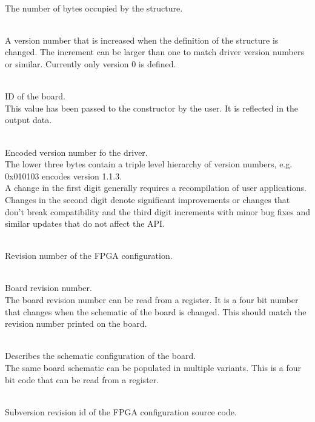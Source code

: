			\\
			The number of bytes occupied by the structure.

			\\
			A version number that is increased when the definition of the structure is changed. The increment can be larger than one to match driver version numbers or similar. Currently only version 0 is defined.\par


			\\
			ID of the board.\\
			This value has been passed to the constructor by the user. It is reflected in the output data.\par

			\\
			Encoded version number fo the driver.\\
			The lower three bytes contain a triple level hierarchy of version numbers, e.g. 0x010103 encodes version 1.1.3.\\
			A change in the first digit generally requires a recompilation of user applications. 
			Changes in the second digit denote significant improvements or changes that don't break compatibility 
			and the third digit increments with minor bug fixes and similar updates that do not affect the API.\par

			\\
			Revision number of the FPGA configuration.

			\\
			Board revision number.\\
			The board revision number can be read from a register. It is a four bit number that changes when the schematic of the board is changed. This should match the revision number printed on the board.

			\\
			Describes the schematic configuration of the board.\\
			The same board schematic can be populated in multiple variants. This is a four bit code that can be read from a register.

			\\
			Subversion revision id of the FPGA configuration source code.

